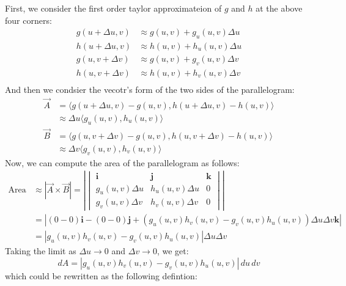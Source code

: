 \documentclass[11pt]{report}
\begin{document}
First, we consider the first order taylor approximateion of $g$ and $h$ at the above four corners:
\begin{align*}
    g(u + \Delta u, v) &\approx g(u,v) + g_u(u,v) \Delta u \\
    h(u + \Delta u, v) &\approx h(u,v) + h_u(u,v) \Delta u \\
    g(u, v + \Delta v) &\approx g(u,v) + g_v(u,v) \Delta v \\
    h(u, v + \Delta v) &\approx h(u,v) + h_v(u,v) \Delta v \\
\end{align*}
And then we condsier the vecotr's form of the two sides of the parallelogram:
\begin{align*}
    \overrightarrow{A} &= \langle g(u + \Delta u, v) - g(u,v), h(u + \Delta u, v) - h(u,v) \rangle \\
    &\approx \Delta u \langle g_u(u,v), h_u(u,v) \rangle \\
    \overrightarrow{B} &= \langle g(u, v + \Delta v) - g(u,v), h(u, v + \Delta v) - h(u,v) \rangle \\
    &\approx \Delta v \langle g_v(u,v), h_v(u,v) \rangle
\end{align*}
Now, we can compute the area of the parallelogram as follows:
\begin{align*}
    \text{Area} &\approx |\overrightarrow{A} \times \overrightarrow{B}| = \left| \begin{vmatrix}
        \mathbf{i} & \mathbf{j} & \mathbf{k} \\
        g_u(u,v) \Delta u & h_u(u,v) \Delta u & 0 \\
        g_v(u,v) \Delta v & h_v(u,v) \Delta v & 0
    \end{vmatrix} \right| \\
    &= \left| (0 - 0) \mathbf{i} - (0 - 0) \mathbf{j} + (g_u(u,v) h_v(u,v) - g_v(u,v) h_u(u,v)) \Delta u \Delta v \mathbf{k} \right| \\
    &= |g_u(u,v) h_v(u,v) - g_v(u,v) h_u(u,v)| \Delta u \Delta v
\end{align*}
Taking the limit as $\Delta u \to 0$ and $\Delta v \to 0$, we get:
$$
dA = |g_u(u,v) h_v(u,v) - g_v(u,v) h_u(u,v)| \, du \, dv
$$
which could be rewritten as the following defintion:
\end{document}
